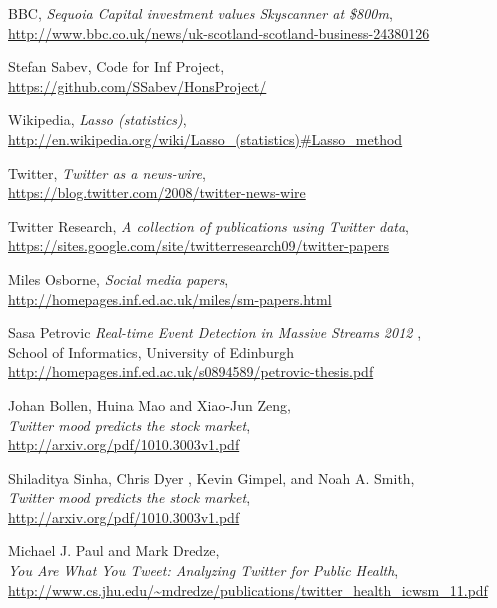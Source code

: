 \documentclass[minf,frontabs,twoside,singlespacing,parskip]{infthesis}
\begin{document}
\begin{thebibliography}{10}

	BBC, \emph{Sequoia Capital investment values Skyscanner at \$800m}, \\
	{\url{http://www.bbc.co.uk/news/uk-scotland-scotland-business-24380126}}

	Stefan Sabev, Code for Inf Project,\\
	{\url{https://github.com/SSabev/HonsProject/}}
	
	Wikipedia, \emph{Lasso (statistics)}, \\
	{\url{http://en.wikipedia.org/wiki/Lasso_(statistics)#Lasso_method}}
	
	Twitter, \emph{Twitter as a news-wire}, \\
	{\url{https://blog.twitter.com/2008/twitter-news-wire}}

	Twitter Research,
	\emph{A collection of publications using Twitter data}, \\
 	{\url{https://sites.google.com/site/twitterresearch09/twitter-papers}}

	Miles Osborne, \emph{Social media papers}, \\
	{\url{http://homepages.inf.ed.ac.uk/miles/sm-papers.html}}
	
	Sasa Petrovic
  	\emph{Real-time Event Detection in Massive Streams 2012} ,\\
	School of Informatics, University of Edinburgh \\
	{\url{http://homepages.inf.ed.ac.uk/s0894589/petrovic-thesis.pdf}}

	Johan Bollen, Huina Mao and Xiao-Jun Zeng, \\
	\emph{Twitter mood predicts the stock market}, \\
	{\url{http://arxiv.org/pdf/1010.3003v1.pdf}}

	Shiladitya Sinha, Chris Dyer , Kevin Gimpel, and Noah A. Smith, \\
	\emph{Twitter mood predicts the stock market}, \\
	{\url{http://arxiv.org/pdf/1010.3003v1.pdf}}

	Michael J. Paul and Mark Dredze,  \\
	\emph{You Are What You Tweet: Analyzing Twitter for Public Health}, \\
	{\url{http://www.cs.jhu.edu/~mdredze/publications/twitter_health_icwsm_11.pdf}}


\end{thebibliography}
\end{document}
